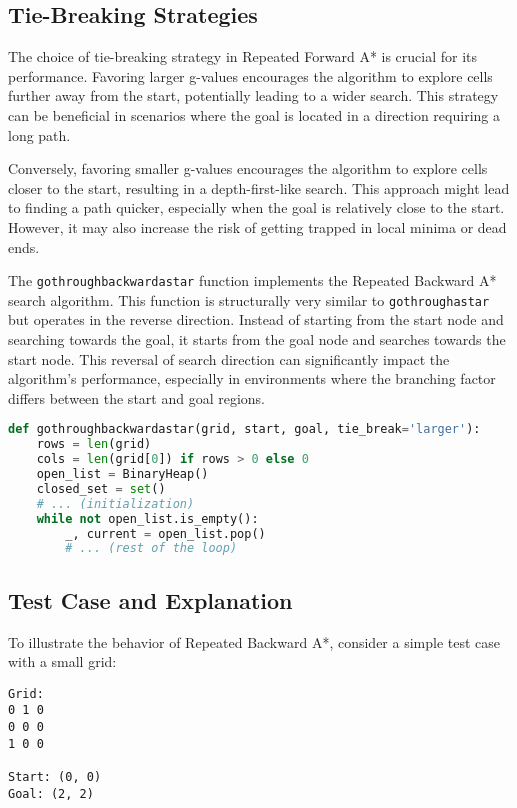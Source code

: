 \documentclass[12pt]{article}
\begin{document}
\subsection{Tie-Breaking Strategies}

The choice of tie-breaking strategy in Repeated Forward A* is crucial for its performance. 
Favoring larger g-values encourages the algorithm to explore cells further away from the start, 
potentially leading to a wider search. 
This strategy can be beneficial in scenarios where the goal is located in a direction requiring a long path.

Conversely, 
favoring smaller g-values encourages the algorithm to explore cells closer to the start, 
resulting in a depth-first-like search. 
This approach might lead to finding a path quicker, 
especially when the goal is relatively close to the start. 
However, it may also increase the risk of getting trapped in local minima or dead ends.

The \texttt{gothroughbackwardastar} function implements the Repeated Backward A* search algorithm. 
This function is structurally very similar to \texttt{gothroughastar} but operates in the reverse direction. 
Instead of starting from the start node and searching towards the goal, 
it starts from the goal node and searches towards the start node. 
This reversal of search direction can significantly impact the algorithm's performance, 
especially in environments where the branching factor differs between the start and goal regions.

\begin{lstlisting}[language=Python, basicstyle=\ttfamily]
def gothroughbackwardastar(grid, start, goal, tie_break='larger'):
    rows = len(grid)
    cols = len(grid[0]) if rows > 0 else 0
    open_list = BinaryHeap()
    closed_set = set()
    # ... (initialization)
    while not open_list.is_empty():
        _, current = open_list.pop()
        # ... (rest of the loop)
\end{lstlisting}

\subsection{Test Case and Explanation}

To illustrate the behavior of Repeated Backward A*, 
consider a simple test case with a small grid:

\begin{verbatim}
Grid:
0 1 0
0 0 0
1 0 0

Start: (0, 0)
Goal: (2, 2)

\end{verbatim}
\end{document}
